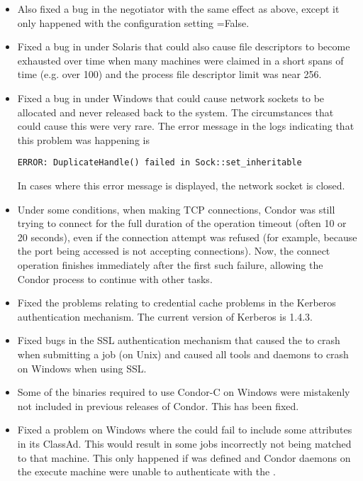 \begin{itemize}
\item Also fixed a bug in the negotiator with the same effect as
above, except it only happened with the configuration setting
=False.

\item Fixed a bug in  under Solaris that could also
cause file descriptors to become exhausted over time when many
machines were claimed in a short spans of time (e.g. over 100) and the
 process file descriptor limit was near 256.

\item Fixed a bug in  under Windows that could cause
network sockets to be allocated and never released back to the system.
The circumstances that could cause this were very rare.  The error
message in the logs indicating that this problem was happening is
\begin{verbatim}
ERROR: DuplicateHandle() failed in Sock::set_inheritable
\end{verbatim}
In cases where this error message is displayed, the network socket
is closed.

\item Under some conditions, when making TCP connections, Condor was
still trying to connect for the full duration of the operation timeout
(often 10 or 20 seconds), even if the connection attempt was refused
(for example, because the port being accessed is not accepting connections).
Now, the connect operation finishes immediately after the first such
failure, allowing the Condor process to continue with other tasks.

\item Fixed the problems relating to credential cache problems in the Kerberos
authentication mechanism.  The current version of Kerberos is 1.4.3.

\item Fixed bugs in the SSL authentication mechanism that caused the
 to crash when submitting a job (on Unix) and caused
all tools and daemons to crash on Windows when using SSL.

\item Some of the binaries required to use Condor-C on Windows were
mistakenly not included in previous releases of Condor. This has been
fixed.

\item Fixed a problem on Windows where the  could fail to
include some attributes in its ClassAd. This would result in some jobs
incorrectly not being matched to that machine.  This only happened if
 was defined and Condor daemons on the execute
machine were unable to authenticate with the .


\end{itemize}

